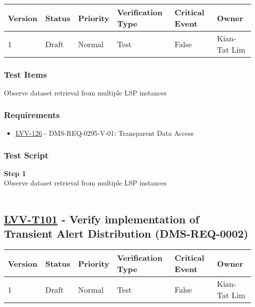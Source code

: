 \begin{longtable}[]{@{}llllll@{}}
\toprule
Version & Status & Priority & Verification Type & Critical Event &
Owner\tabularnewline
\midrule
\endhead
1 & Draft & Normal & Test & False & Kian-Tat Lim\tabularnewline
\bottomrule
\end{longtable}

\hypertarget{test-items}{%
\subsubsection{Test Items}\label{test-items}}

Observe dataset retrieval from multiple LSP instances

\hypertarget{requirements}{%
\subsubsection{Requirements}\label{requirements}}

\begin{itemize}
\tightlist
\item
  \href{https://jira.lsstcorp.org/browse/LVV-126}{LVV-126} -
  DMS-REQ-0295-V-01: Transparent Data Access
\end{itemize}

\hypertarget{test-script}{%
\subsubsection{Test Script}\label{test-script}}

\textbf{Step 1}\\
Observe dataset retrieval from multiple LSP instances\\
~\\

\hypertarget{lvv-t101---verify-implementation-of-transient-alert-distribution-dms-req-0002}{%
\subsection{\texorpdfstring{\href{https://jira.lsstcorp.org/secure/Tests.jspa\#/testCase/LVV-T101}{LVV-T101}
- Verify implementation of Transient Alert Distribution
(DMS-REQ-0002)}{LVV-T101 - Verify implementation of Transient Alert Distribution (DMS-REQ-0002)}}\label{lvv-t101---verify-implementation-of-transient-alert-distribution-dms-req-0002}}

\begin{longtable}[]{@{}llllll@{}}
\toprule
Version & Status & Priority & Verification Type & Critical Event &
Owner\tabularnewline
\midrule
\endhead
1 & Draft & Normal & Test & False & Kian-Tat Lim\tabularnewline
\bottomrule
\end{longtable}

